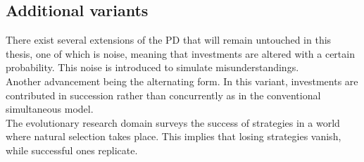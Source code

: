 \documentclass{article}
\begin{document}


\subsection{Additional variants}

There exist several extensions of the PD that will remain untouched in this thesis, one of which is noise, meaning that investments are altered with a certain probability.
This noise is introduced to simulate misunderstandings.\\
Another advancement being the alternating form.
In this variant, investments are contributed in succession rather than concurrently as in the conventional simultaneous model.\\
The evolutionary research domain surveys the success of strategies in a world where natural selection takes place.
This implies that losing strategies vanish, while successful ones replicate.
\end{document}
